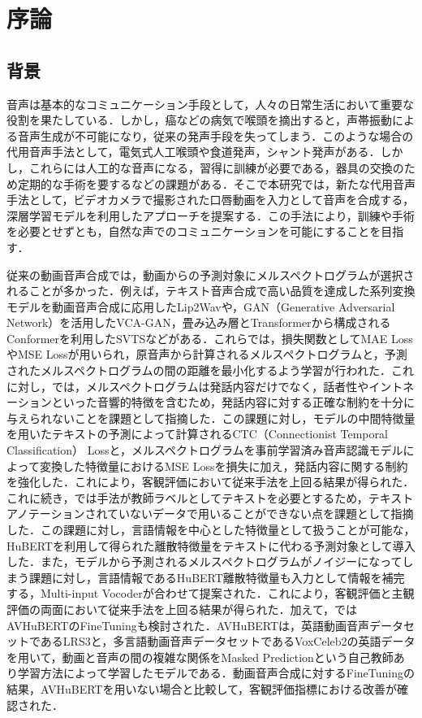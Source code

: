 \section{序論}
\subsection{背景}
音声は基本的なコミュニケーション手段として，人々の日常生活において重要な役割を果たしている．しかし，癌などの病気で喉頭を摘出すると，声帯振動による音声生成が不可能になり，従来の発声手段を失ってしまう．このような場合の代用音声手法として，電気式人工喉頭や食道発声，シャント発声がある．しかし，これらには人工的な音声になる，習得に訓練が必要である，器具の交換のため定期的な手術を要するなどの課題がある．そこで本研究では，新たな代用音声手法として，ビデオカメラで撮影された口唇動画を入力として音声を合成する，深層学習モデルを利用したアプローチを提案する．この手法により，訓練や手術を必要とせずとも，自然な声でのコミュニケーションを可能にすることを目指す．

従来の動画音声合成では，動画からの予測対象にメルスペクトログラムが選択されることが多かった．例えば，テキスト音声合成で高い品質を達成した系列変換モデル\cite{shen2018natural}を動画音声合成に応用したLip2Wav\cite{prajwal2020learning}や，GAN（Generative Adversarial Network）を活用したVCA-GAN\cite{kim2021lip}，畳み込み層とTransformer\cite{vaswani2017attention}から構成されるConformer\cite{gulati2020conformer}を利用したSVTS\cite{mira2022svts}などがある．これらでは，損失関数としてMAE LossやMSE Lossが用いられ，原音声から計算されるメルスペクトログラムと，予測されたメルスペクトログラムの間の距離を最小化するよう学習が行われた．これに対し，\cite{kim2023lip_multitask}では，メルスペクトログラムは発話内容だけでなく，話者性やイントネーションといった音響的特徴を含むため，発話内容に対する正確な制約を十分に与えられないことを課題として指摘した．この課題に対し，モデルの中間特徴量を用いたテキストの予測によって計算されるCTC（Connectionist Temporal Classification） Lossと，メルスペクトログラムを事前学習済み音声認識モデルによって変換した特徴量におけるMSE Lossを損失に加え，発話内容に関する制約を強化した．これにより，客観評価において従来手法を上回る結果が得られた．これに続き，\cite{choi2023intelligible}では手法\cite{kim2023lip_multitask}が教師ラベルとしてテキストを必要とするため，テキストアノテーションされていないデータで用いることができない点を課題として指摘した．この課題に対し，言語情報を中心とした特徴量として扱うことが可能な，HuBERT\cite{hsu2021hubert}を利用して得られた離散特徴量をテキストに代わる予測対象として導入した．また，モデルから予測されるメルスペクトログラムがノイジーになってしまう課題に対し，言語情報であるHuBERT離散特徴量も入力として情報を補完する，Multi-input Vocoderが合わせて提案された．これにより，客観評価と主観評価の両面において従来手法を上回る結果が得られた．加えて，\cite{choi2023intelligible}ではAVHuBERT\cite{shi2022learning}のFineTuningも検討された．AVHuBERTは，英語動画音声データセットであるLRS3\cite{afouras2018lrs3}と，多言語動画音声データセットであるVoxCeleb2\cite{chung2018voxceleb2}の英語データを用いて，動画と音声の間の複雑な関係をMasked Predictionという自己教師あり学習方法によって学習したモデルである．動画音声合成に対するFineTuningの結果，AVHuBERTを用いない場合と比較して，客観評価指標における改善が確認された．

